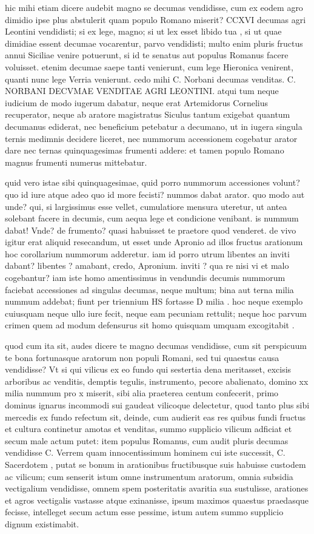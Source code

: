  hic mihi etiam dicere audebit magno se decumas vendidisse, cum ex eodem agro dimidio ipse plus abstulerit quam populo Romano miserit? CCXVI decumas agri Leontini vendidisti; si ex lege, magno; si ut lex esset libido tua , si ut quae dimidiae essent decumae vocarentur, parvo vendidisti; multo enim pluris fructus annui Siciliae venire potuerunt, si id te senatus aut populus Romanus facere voluisset. etenim decumae saepe tanti venierunt, cum lege Hieronica venirent, quanti nunc lege Verria venierunt. cedo mihi C. Norbani decumas venditas. C. NORBANI DECVMAE VENDITAE AGRI LEONTINI. atqui tum neque iudicium de modo iugerum dabatur, neque erat Artemidorus Cornelius recuperator, neque ab aratore magistratus Siculus tantum exigebat quantum decumanus ediderat, nec beneficium petebatur a decumano, ut in iugera singula ternis medimnis decidere liceret, nec nummorum accessionem cogebatur arator dare nec ternas quinquagesimas frumenti addere: et tamen populo Romano magnus frumenti numerus mittebatur.

 quid vero istae sibi quinquagesimae, quid porro nummorum accessiones volunt? quo id iure atque adeo quo id more fecisti? nummos dabat arator. quo modo aut unde? qui, si largissimus esse vellet, cumulatiore mensura uteretur, ut antea solebant facere in decumis, cum aequa lege et condicione venibant. is nummum dabat! Vnde? de frumento? quasi habuisset te praetore quod venderet. de vivo igitur erat aliquid resecandum, ut esset unde Apronio ad illos fructus arationum hoc corollarium nummorum adderetur. iam id porro utrum libentes an inviti dabant? libentes ? amabant, credo, Apronium. inviti ? qua re nisi vi et malo cogebantur? iam iste homo amentissimus in vendundis decumis nummorum faciebat accessiones ad singulas decumas, neque multum; bina aut terna milia nummum addebat; fiunt per triennium HS fortasse D milia . hoc neque exemplo cuiusquam neque ullo iure fecit, neque eam pecuniam rettulit; neque hoc parvum crimen quem ad modum defensurus sit homo quisquam umquam excogitabit .

 quod cum ita sit, audes dicere te magno decumas vendidisse, cum sit perspicuum te bona fortunasque aratorum non populi Romani, sed tui quaestus causa vendidisse? Vt si qui vilicus ex eo fundo qui sestertia dena meritasset, excisis arboribus ac venditis, demptis tegulis, instrumento, pecore abalienato, domino xx milia nummum pro x miserit, sibi alia praeterea centum confecerit, primo dominus ignarus incommodi sui gaudeat vilicoque delectetur, quod tanto plus sibi mercedis ex fundo refectum sit, deinde, cum audierit eas res quibus fundi fructus et cultura continetur amotas et venditas, summo supplicio vilicum adficiat et secum male actum putet: item populus Romanus, cum audit pluris decumas vendidisse C. Verrem quam innocentissimum hominem cui iste successit, C. Sacerdotem , putat se bonum in arationibus fructibusque suis habuisse custodem ac vilicum; cum senserit istum omne instrumentum aratorum, omnia subsidia vectigalium vendidisse, omnem spem posteritatis avaritia sua sustulisse, arationes et agros vectigalis vastasse atque exinanisse, ipsum maximos quaestus praedasque fecisse, intelleget secum actum esse pessime, istum autem summo supplicio dignum existimabit.

